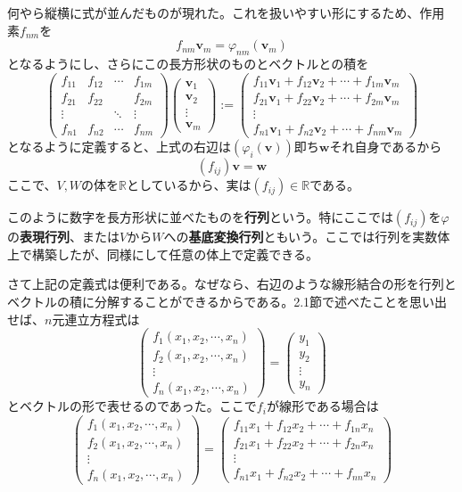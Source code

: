 \documentclass[dvipdfmx]{jsarticle}
\begin{document}
何やら縦横に式が並んだものが現れた。これを扱いやすい形にするため、作用素$f_{nm}$を
\[f_{nm}\bm{v}_m=\varphi_{nm}(\bm{v}_m)\]
となるようにし、さらにこの長方形状のものとベクトルとの積を
\[\begin{pmatrix}f_{11}&f_{12}&\cdots&f_{1m}\\f_{21}&f_{22}&{}&f_{2m}\\\vdots&{}&\ddots&\vdots\\f_{n1}&f_{n2}&\cdots&f_{nm}\end{pmatrix}\begin{pmatrix}\bm{v}_1\\\bm{v}_2\\\vdots\\\bm{v}_m\end{pmatrix}:=\begin{pmatrix}f_{11}\bm{v}_1+f_{12}\bm{v}_2+\cdots+f_{1m}\bm{v}_m\\f_{21}\bm{v}_1+f_{22}\bm{v}_2+\cdots+f_{2m}\bm{v}_m\\\vdots\\f_{n1}\bm{v}_1+f_{n2}\bm{v}_2+\cdots+f_{nm}\bm{v}_m\end{pmatrix}\]
となるように定義すると、上式の右辺は$(\varphi_i(\bm{v}))$即ち$\bm{w}$それ自身であるから
\[(f_{ij})\bm{v}=\bm{w}\]
ここで、$V,W$の体を$\mathbb{R}$としているから、実は$(f_{ij})\in\mathbb{R}$である。\par
このように数字を長方形状に並べたものを\textbf{行列}という。特にここでは$(f_{ij})$を$\varphi$の\textbf{表現行列}、または$V$から$W$への\textbf{基底変換行列}ともいう。ここでは行列を実数体上で構築したが、同様にして任意の体上で定義できる。\par
さて上記の定義式は便利である。なぜなら、右辺のような線形結合の形を行列とベクトルの積に分解することができるからである。2.1節で述べたことを思い出せば、$n$元連立方程式は
\[\begin{pmatrix}f_1(x_1,x_2,\cdots,x_n)\\f_2(x_1,x_2,\cdots,x_n)\\\vdots\\f_n(x_1,x_2,\cdots,x_n)\end{pmatrix}=\begin{pmatrix}y_1\\y_2\\\vdots\\y_n\end{pmatrix}\]
とベクトルの形で表せるのであった。ここで$f_i$が線形である場合は
\[\begin{pmatrix}f_1(x_1,x_2,\cdots,x_n)\\f_2(x_1,x_2,\cdots,x_n)\\\vdots\\f_n(x_1,x_2,\cdots,x_n)\end{pmatrix}=\begin{pmatrix}f_{11}x_1+f_{12}x_2+\cdots+f_{1n}x_n\\f_{21}x_1+f_{22}x_2+\cdots+f_{2n}x_n\\\vdots\\f_{n1}x_1+f_{n2}x_2+\cdots+f_{nn}x_n\end{pmatrix}\]
\end{document}
